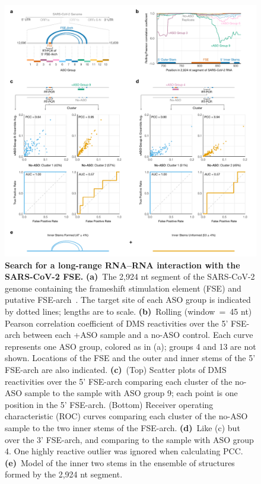\documentclass[main.tex]{subfiles}
\begin{document}
\begin{figure}[H]
	\includegraphics[width=\textwidth]{../MainFigures/sars2-tile/sars2-tile.pdf}
	\caption{\textbf{Search for a long-range RNA--RNA interaction with the SARS-CoV-2 FSE.} \textbf{(a)}~The 2,924 nt segment of the SARS-CoV-2 genome containing the frameshift stimulation element (FSE) and putative FSE-arch~\cite{Ziv2020}. The target site of each ASO group is indicated by dotted lines; lengths are to scale. \textbf{(b)}~Rolling (window~=~45 nt) Pearson correlation coefficient of DMS reactivities over the 5' FSE-arch between each +ASO sample and a no-ASO control. Each curve represents one ASO group, colored as in (a); groups 4 and 13 are not shown. Locations of the FSE and the outer and inner stems of the 5' FSE-arch are also indicated. \textbf{(c)}~(Top) Scatter plots of DMS reactivities over the 5' FSE-arch comparing each cluster of the no-ASO sample to the sample with ASO group 9; each point is one position in the 5' FSE-arch. (Bottom) Receiver operating characteristic (ROC) curves comparing each cluster of the no-ASO sample to the two inner stems of the FSE-arch. \textbf{(d)}~Like (c) but over the 3' FSE-arch, and comparing to the sample with ASO group 4. One highly reactive outlier was ignored when calculating PCC. \textbf{(e)}~Model of the inner two stems in the ensemble of structures formed by the 2,924 nt segment.}
	\label{tiles}
\end{figure}
\end{document}
